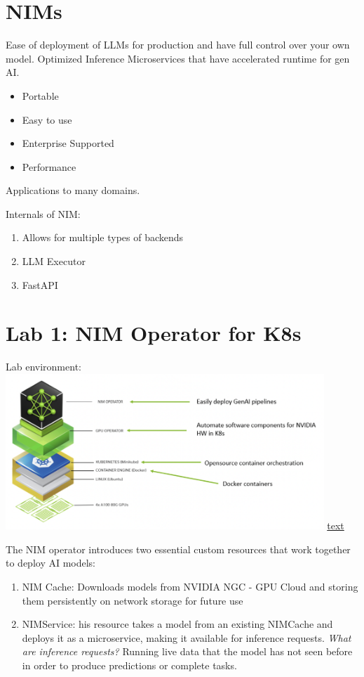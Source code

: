 \documentclass{article}
\begin{document}
\section{NIMs}
Ease of deployment of LLMs for production and have full control over your own model. Optimized Inference Microservices that have accelerated runtime for gen AI. \begin{itemize}
    \item Portable 
    \item Easy to use
    \item Enterprise Supported
    \item Performance 
\end{itemize}
Applications to many domains.

Internals of NIM: 
\begin{enumerate}
    \item Allows for multiple types of backends
    \item LLM Executor
    \item FastAPI
\end{enumerate}

\section{Lab 1: NIM Operator for K8s}
Lab environment:\\\includegraphics[width=0.9\textwidth]{../images/labenvir.png}
\href{https://docs.nvidia.com/nim-operator/latest/install.html}{text}

The NIM operator introduces two essential custom resources that work together to deploy AI models: \begin{enumerate}
    \item NIM Cache: Downloads models from NVIDIA NGC - GPU Cloud and storing them persistently on network storage for future use
    \item NIMService: his resource takes a model from an existing NIMCache and deploys it as a microservice, making it available for inference requests.
    \textit{What are inference requests?} Running live data that the model has not seen before in order to produce predictions or complete tasks. 
\end{enumerate}
\end{document}
